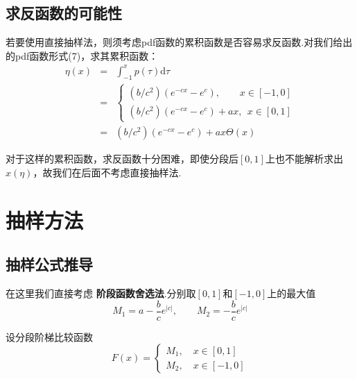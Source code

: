 \documentclass[12pt,a4paper,utf8]{ctexart}
\begin{document}
\subsection{求反函数的可能性}

若要使用直接抽样法，则须考虑pdf函数的累积函数是否容易求反函数.对我们给出的pdf函数形式(7)，求其累积函数：
\begin{eqnarray}
    \eta(x) &=& \int _{-1} ^{x} p(\tau) \textrm{d}\tau \nonumber \\
           &=& 
           \begin{cases}
               (b/c^2)(e^{-cx}-e^c),~~~~~~~~~ x \in [-1,0] \\
               (b/c^2)(e^{-cx}-e^c) + ax,~~ x \in [0,1] 
           \end{cases} \nonumber \\
           &=& (b/c^2)(e^{-cx}-e^c) + ax \Theta(x)
\end{eqnarray}

对于这样的累积函数，求反函数十分困难，即使分段后$[0,1]$上也不能解析求出$x(\eta)$，故我们在后面不考虑直接抽样法.
\section{抽样方法}

\subsection{抽样公式推导}

在这里我们直接考虑 \textbf{阶段函数舍选法}.分别取$[0,1]$和$[-1,0]$上的最大值
\begin{equation}
    M_1 = a - \frac{b}{c}e^{|c|},\qquad M_2 = - \frac{b}{c}e^{|c|}
\end{equation}

设分段阶梯比较函数
\begin{equation}
    F(x) = 
    \begin{cases}
        M_1,\quad x \in [0,1] \\
        M_2,\quad x \in [-1,0]
    \end{cases}
\end{equation}
\end{document}
